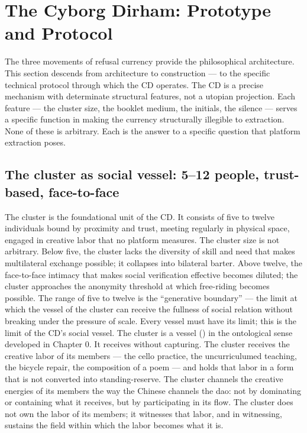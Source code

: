 \section{The Cyborg Dirham: Prototype and Protocol}

The three movements of refusal currency provide the philosophical architecture. This section descends from architecture to construction — to the specific technical protocol through which the CD operates. The CD is a precise mechanism with determinate structural features, not a utopian projection. Each feature — the cluster size, the booklet medium, the initials, the silence — serves a specific function in making the currency structurally illegible to extraction. None of these is arbitrary. Each is the answer to a specific question that platform extraction poses.

\subsection{The cluster as social vessel: 5–12 people, trust-based, face-to-face}

The cluster is the foundational unit of the CD. It consists of five to twelve individuals bound by proximity and trust, meeting regularly in physical space, engaged in creative labor that no platform measures. The cluster size is not arbitrary. Below five, the cluster lacks the diversity of skill and need that makes multilateral exchange possible; it collapses into bilateral barter. Above twelve, the face-to-face intimacy that makes social verification effective becomes diluted; the cluster approaches the anonymity threshold at which free-riding becomes possible. The range of five to twelve is the “generative boundary” — the limit at which the vessel of the cluster can receive the fullness of social relation without breaking under the pressure of scale. Every vessel must have its limit; this is the limit of the CD’s social vessel. The cluster is a vessel () in the ontological sense developed in Chapter 0. It receives without capturing. The cluster receives the creative labor of its members — the cello practice, the uncurriculumed teaching, the bicycle repair, the composition of a poem — and holds that labor in a form that is not converted into standing-reserve. The cluster channels the creative energies of its members the way the Chinese  channels the dao: not by dominating or containing what it receives, but by participating in its flow. The cluster does not own the labor of its members; it witnesses that labor, and in witnessing, sustains the field within which the labor becomes what it is.

